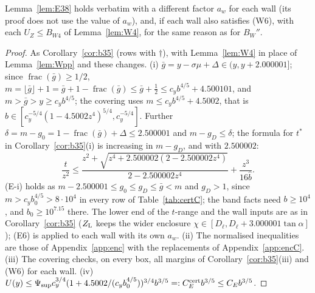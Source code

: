 \documentclass[11pt]{amsart}
\newcommand{\ta}{\tan\alpha}
\theoremstyle{definition}
\theoremstyle{remark}
\numberwithin{equation}{section}
\begin{document}
Lemma~\ref{lem:E38} holds verbatim with a different factor $a_w$ for each wall (its proof does not use the value of
$a_w$), and, if each wall also satisfies (W6), with each $U_Z\le B_{W4}$ of Lemma~\ref{lem:W4}, for the same reason as for
$B_W''$.

\begin{proof}
As Corollary~\ref{cor:b35} (rows with $\dagger$), with Lemma~\ref{lem:W4} in place of Lemma~\ref{lem:Wpp} and these
changes. (i) $\bar g=y-\sigma\mu+\Delta\in(y,y+2.000001]$; since $\operatorname{frac}(\bar g)\ge1/2$,
$m=\lfloor\bar g\rfloor+1=\bar g+1-\operatorname{frac}(\bar g)\le\bar g+\frac12\le c_yb^{4/5}+4.500101$, and
$m>\bar g>y\ge c_yb^{4/5}$; the covering uses $m\le c_yb^{4/5}+4.5002$, that is
$\hat b\in[c_y^{-5/4}(1-4.5002z^4)^{5/4},c_y^{-5/4}]$. Further $\delta=m-g_0=1-\operatorname{frac}(\bar g)+\Delta\le2.500001$
and $m-g_D\le\delta$; the formula for $t^*$ in Corollary~\ref{cor:b35}(i) is increasing in $m-g_D$, and with $2.500002$:
\[
\frac t{z^2}\le\frac{z^2+\sqrt{z^4+2.500002(2-2.500002z^4)}}{2-2.500002z^4}+\frac{z^3}{16\hat b}.
\]
(E-i) holds as $m-2.500001\le g_0\le g_D\le\bar g<m$ and $g_D>1$, since $m>c_yb_0^{4/5}>8\cdot10^4$ in every row of
Table~\ref{tab:certC}; the band facts need $b\ge10^4$, and $b_0\ge10^{7.15}$ there. The lower end of the $t$-range and the
wall inputs are as in Corollary~\ref{cor:b35} ($Z_{\rm L}$ keeps the wider enclosure
$\chi\in[D_\ell,D_\ell+3.000001\ta]$); (E6) is applied to each wall with its own $a_w$. (ii) The normalised inequalities
are those of Appendix~\ref{app:enc} with the replacements of Appendix~\ref{app:encC}. (iii) The covering checks, on every
box, all margins of Corollary~\ref{cor:b35}(iii) and (W6) for each wall. (iv)
$U(y)\le\Psi_{\sup}c_y^{3/4}(1+4.5002/(c_yb_0^{4/5}))^{3/4}b^{3/5}=:C_E^{\rm cert}b^{3/5}\le C_Eb^{3/5}$.
\end{proof}
\end{document}
